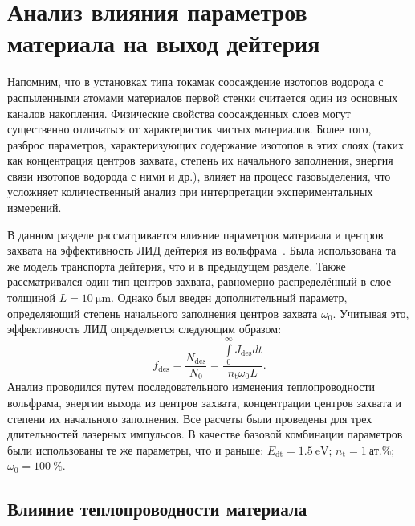 \section{Анализ влияния параметров материала на выход дейтерия}\label{sec:ch4/seс3}
Напомним, что в установках типа токамак соосаждение изотопов водорода с распыленными атомами материалов первой стенки считается один из основных каналов накопления. Физические свойства соосажденных слоев могут существенно отличаться от характеристик чистых материалов. Более того, разброс параметров, характеризующих содержание изотопов в этих слоях (таких как концентрация центров захвата, степень их начального заполнения, энергия связи изотопов водорода с ними и др.), влияет на процесс газовыделения, что усложняет количественный анализ при интерпретации экспериментальных измерений.

В данном разделе рассматривается влияние параметров материала и центров захвата на эффективность ЛИД дейтерия из вольфрама~\cite{Kulagin2023}. Была использована та же модель транспорта дейтерия, что и в предыдущем разделе. Также рассматривался один тип центров захвата, равномерно распределённый в слое толщиной \( L=\SI{10}{\micro\meter}\). Однако был введен дополнительный параметр, определяющий степень начального заполнения центров захвата \(\omega_0 \). Учитывая это, эффективность ЛИД определяется следующим образом:
\begin{equation}
    f_\mathrm{des} = \dfrac{N_\mathrm{des}}{N_0}=\dfrac{\int\limits_0^\infty J_\mathrm{des}dt}{n_\mathrm{t}\omega_0 L}.
\end{equation}
Анализ проводился путем последовательного изменения теплопроводности вольфрама, энергии выхода из центров захвата, концентрации центров захвата и степени их начального заполнения. Все расчеты были проведены для трех длительностей лазерных импульсов. В качестве базовой комбинации параметров были использованы те же параметры, что и раньше: \(E_\mathrm{dt}=\SI{1.5}{\electronvolt} \); \( n_\mathrm{t}=\SI{1}{\text{ат.}\percent} \); \( \omega_0=\SI{100}{\percent} \).

\subsection{Влияние теплопроводности материала}\label{subsec:ch4/seс3/subsec1}

